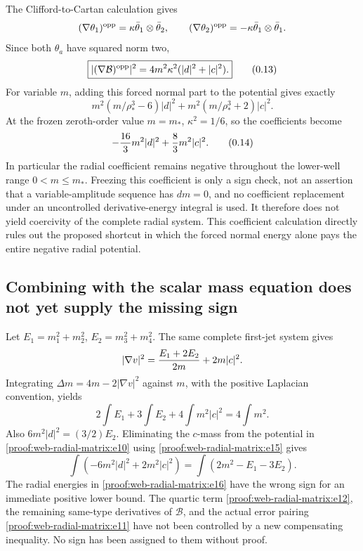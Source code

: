 The Clifford-to-Cartan calculation gives \[
 (\nabla\theta_1)^{\rm opp}=\kappa\bar\theta_1\otimes\bar\theta_2,
 \qquad
 (\nabla\theta_2)^{\rm opp}=-\kappa\bar\theta_1\otimes\bar\theta_1.
\] Since both \(\theta_a\) have squared norm two, \[
 \boxed{|(\nabla\mathcal B)^{\rm opp}|^2
       =4m^2\kappa^2(|d|^2+|c|^2).}
 \tag{\thesection.13}\label{proof:web-radial-matrix:e13}
\] For variable \(m\), adding this forced normal part to the potential gives exactly \[m^2(m/\rho_*^3-6)|d|^2+m^2(m/\rho_*^3+2)|c|^2.\] At the frozen zeroth-order value \(m=m_*\), \(\kappa^2=1/6\), so the coefficients become \[
 -{16\over3}m^2|d|^2+{8\over3}m^2|c|^2.
 \tag{\thesection.14}\label{proof:web-radial-matrix:e14}
\] In particular the radial coefficient remains negative throughout the lower-well range \(0<m\le m_*\). Freezing this coefficient is only a sign check, not an assertion that a variable-amplitude sequence has \(dm=0\), and no coefficient replacement under an uncontrolled derivative-energy integral is used. It therefore does not yield coercivity of the complete radial system. This coefficient calculation directly rules out the proposed shortcut in which the forced normal energy alone pays the entire negative radial potential.

\hypertarget{proof:web-radial-matrix:s5}{%
\subsection{Combining with the scalar mass equation does not yet supply the missing sign}\label{proof:web-radial-matrix:s5}}

Let \(E_1=m_1^2+m_2^2\), \(E_2=m_3^2+m_4^2\). The same complete first-jet system gives \[
 |\nabla v|^2={E_1+2E_2\over2m}+2m|c|^2.
\] Integrating \(\Delta m=4m-2|\nabla v|^2\) against \(m\), with the positive Laplacian convention, yields \[
 2\int E_1+3\int E_2+4\int m^2|c|^2=4\int m^2.
 \tag{\thesection.15}\label{proof:web-radial-matrix:e15}
\] Also \(6m^2|d|^2=(3/2)E_2\). Eliminating the \(c\)-mass from the potential in \eqref{proof:web-radial-matrix:e10} using \eqref{proof:web-radial-matrix:e15} gives \[
 \int(-6m^2|d|^2+2m^2|c|^2)
 =\int(2m^2-E_1-3E_2).
 \tag{\thesection.16}\label{proof:web-radial-matrix:e16}
\] The radial energies in \eqref{proof:web-radial-matrix:e16} have the wrong sign for an immediate positive lower bound. The quartic term \eqref{proof:web-radial-matrix:e12}, the remaining same-type derivatives of \(\mathcal B\), and the actual error pairing \eqref{proof:web-radial-matrix:e11} have not been controlled by a new compensating inequality. No sign has been assigned to them without proof.


